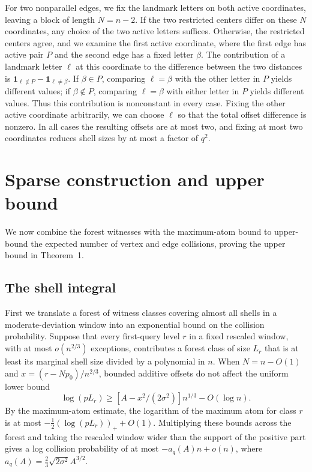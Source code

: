 For two nonparallel edges, we fix the landmark letters on both active coordinates, leaving a block of length $N=n-2$. If the two restricted centers differ on these $N$ coordinates, any choice of the two active letters suffices. Otherwise, the restricted centers agree, and we examine the first active coordinate, where the first edge has active pair $P$ and the second edge has a fixed letter $\beta$. The contribution of a landmark letter $\ell$ at this coordinate to the difference between the two distances is $\mathbf{1}_{\ell\notin P}-\mathbf{1}_{\ell\ne\beta}$. If $\beta\in P$, comparing $\ell=\beta$ with the other letter in $P$ yields different values; if $\beta\notin P$, comparing $\ell=\beta$ with either letter in $P$ yields different values. Thus this contribution is nonconstant in every case. Fixing the other active coordinate arbitrarily, we can choose $\ell$ so that the total offset difference is nonzero. In all cases the resulting offsets are at most two, and fixing at most two coordinates reduces shell sizes by at most a factor of $q^2$.

\section{Sparse construction and upper bound}\label{app:sparse-upper}
We now combine the forest witnesses with the maximum-atom bound to upper-bound the expected number of vertex and edge collisions, proving the upper bound in Theorem~1.

\subsection{The shell integral}
First we translate a forest of witness classes covering almost all shells in a moderate-deviation window into an exponential bound on the collision probability. Suppose that every first-query level $r$ in a fixed rescaled window, with at most $o(n^{2/3})$ exceptions, contributes a forest class of size $L_r$ that is at least its marginal shell size divided by a polynomial in $n$. When $N=n-O(1)$ and $x=(r-Np_0)/n^{2/3}$, bounded additive offsets do not affect the uniform lower bound
\[
 \log(pL_r)\ge [A-x^2/(2\sigma^2)]n^{1/3}-O(\log n).
\]
By the maximum-atom estimate, the logarithm of the maximum atom for class $r$ is at most $-\frac12(\log(pL_r))_++O(1)$. Multiplying these bounds across the forest and taking the rescaled window wider than the support of the positive part gives a log collision probability of at most $-a_q(A)n+o(n)$, where $a_q(A)=\frac23\sqrt{2\sigma^2}A^{3/2}$.

